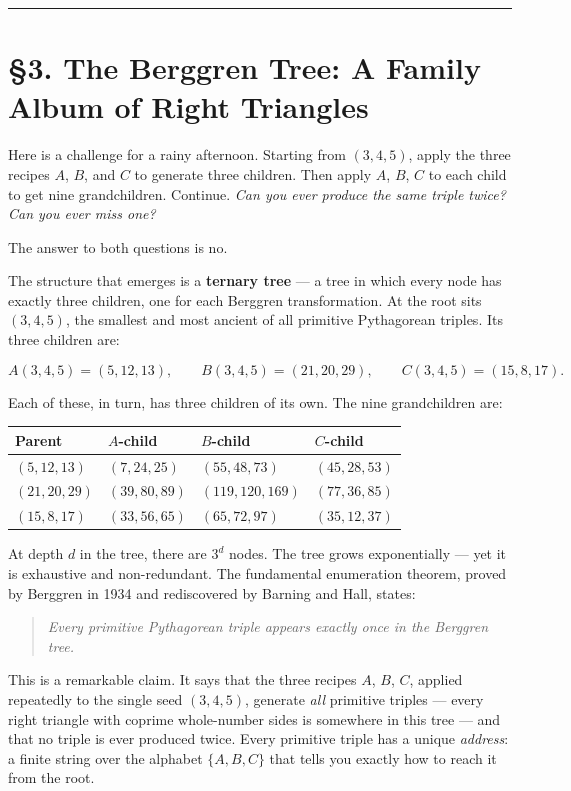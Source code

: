\bigskip\noindent\rule{\linewidth}{0.4pt}\bigskip

\section{§3. The Berggren Tree: A Family Album of Right Triangles}
Here is a challenge for a rainy afternoon. Starting from \((3, 4, 5)\), apply the three recipes \(A\), \(B\), and \(C\) to generate three children. Then apply \(A\), \(B\), \(C\) to each child to get nine grandchildren. Continue. \emph{Can you ever produce the same triple twice? Can you ever miss one?}

The answer to both questions is no.

The structure that emerges is a \textbf{ternary tree} --- a tree in which every node has exactly three children, one for each Berggren transformation. At the root sits \((3, 4, 5)\), the smallest and most ancient of all primitive Pythagorean triples. Its three children are:

\[A(3,4,5) = (5, 12, 13), \qquad B(3,4,5) = (21, 20, 29), \qquad C(3,4,5) = (15, 8, 17).\]

Each of these, in turn, has three children of its own. The nine grandchildren are:

\begin{longtable}[]{@{}llll@{}}
\toprule\noalign{}
Parent & \(A\)-child & \(B\)-child & \(C\)-child \\
\midrule\noalign{}
\endhead
\bottomrule\noalign{}
\endlastfoot
\((5, 12, 13)\) & \((7, 24, 25)\) & \((55, 48, 73)\) & \((45, 28, 53)\) \\
\((21, 20, 29)\) & \((39, 80, 89)\) & \((119, 120, 169)\) & \((77, 36, 85)\) \\
\((15, 8, 17)\) & \((33, 56, 65)\) & \((65, 72, 97)\) & \((35, 12, 37)\) \\
\end{longtable}

At depth \(d\) in the tree, there are \(3^d\) nodes. The tree grows exponentially --- yet it is exhaustive and non-redundant. The fundamental enumeration theorem, proved by Berggren in 1934 and rediscovered by Barning and Hall, states:

\begin{quote}
\emph{Every primitive Pythagorean triple appears exactly once in the Berggren tree.}
\end{quote}

This is a remarkable claim. It says that the three recipes \(A\), \(B\), \(C\), applied repeatedly to the single seed \((3, 4, 5)\), generate \emph{all} primitive triples --- every right triangle with coprime whole-number sides is somewhere in this tree --- and that no triple is ever produced twice. Every primitive triple has a unique \emph{address}: a finite string over the alphabet \(\{A, B, C\}\) that tells you exactly how to reach it from the root.

